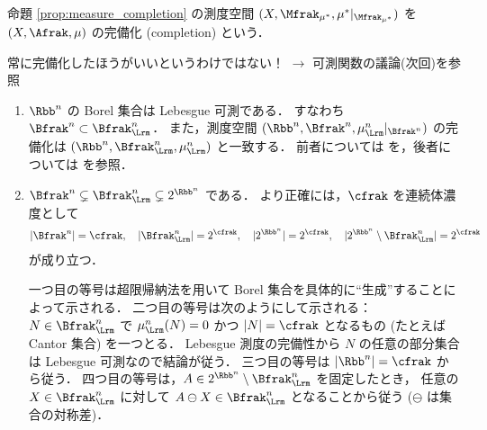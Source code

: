 \begin{definition}
    命題 \ref{prop:measure_completion} の測度空間 $(X,\Mfrak_{\mu^*},\mu^\ast\vert_{\Mfrak_{\mu^\ast}})$ を
    $(X,\Afrak,\mu)$ の完備化 (completion) という．
\end{definition}

常に完備化したほうがいいというわけではない！
$\to$ 可測関数の議論(次回)を参照

\begin{remark}
    \leavevmode
    \begin{enumerate}
        \item
            $\Rbb^n$ の Borel 集合は Lebesgue 可測である．
            すなわち $\Bfrak^n\subset\Bfrak_\Lrm^n$．
            また，測度空間 $(\Rbb^n,\Bfrak^n,\mu_\Lrm^n\vert_{\Bfrak^n})$ の完備化は
            $(\Rbb^n,\Bfrak_\Lrm^n,\mu_\Lrm^n)$ と一致する．
            前者については \cite[定理 7.2]{It63} を，後者については \cite[p.49]{It63} を参照．

        \item
            $\Bfrak^n\subsetneq\Bfrak_\Lrm^n\subsetneq2^{\Rbb^n}$ である．
            より正確には，$\cfrak$ を連続体濃度として
            \begin{align}
                |\Bfrak^n|=\cfrak,\quad
                |\Bfrak_\Lrm^n|=2^\cfrak,\quad
                |2^{\Rbb^n}|=2^\cfrak,\quad
                |2^{\Rbb^n}\setminus\Bfrak_\Lrm^n|=2^\cfrak
            \end{align}
            が成り立つ．

            一つ目の等号は超限帰納法を用いて Borel 集合を具体的に``生成''することによって示される\cite{ms70880}．
            二つ目の等号は次のようにして示される：
            $N\in\Bfrak_\Lrm^n$ で $\mu_\Lrm^n(N)=0$ かつ $|N|=\cfrak$ となるもの (たとえば Cantor 集合) を一つとる．
            Lebesgue 測度の完備性から $N$ の任意の部分集合は Lebesgue 可測なので結論が従う．
            三つ目の等号は $|\Rbb^n|=\cfrak$ から従う．
            四つ目の等号は，$A\in2^{\Rbb^n}\setminus\Bfrak_\Lrm^n$ を固定したとき，
            任意の $X\in\Bfrak_\Lrm^n$ に対して $A\ominus X\in\Bfrak_\Lrm^n$ となることから従う ($\ominus$ は集合の対称差)．


\end{enumerate}
\end{remark}
